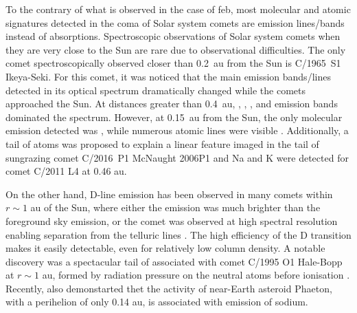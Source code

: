 \documentclass{aa}
\begin{document}
To the contrary of what is observed in the case of \ac{feb}, most molecular and atomic signatures detected in the coma of Solar system comets are emission lines/bands instead of absorptions.
%
Spectroscopic observations of Solar system comets when they are very close to the Sun are rare due to observational difficulties.
%
The only comet spectroscopically observed closer than 0.2~au from the Sun is C/1965~S1 Ikeya-Seki.
%
%
%
For this comet, it was noticed that the main emission bands/lines detected in its optical spectrum dramatically changed while the comets approached the Sun.
%
At distances greater than 0.4~au, , , , and  emission bands dominated the spectrum.
%
However, at 0.15~au from the Sun, the only molecular emission detected was , while numerous atomic lines were visible \citep[, , , , , , , , , ; ][]{Dufay65,Thackeray1966,Preston1967,Slaughter1969}.
%
Additionally, a tail of  atoms was proposed to explain a linear feature imaged in the tail of sungrazing comet C/2016~P1 McNaught 2006P1 \citep{Fulle2007} and Na and K were detected for comet C/2011 L4 \citep{Fulle13} at 0.46 au. 

On the other hand,  D-line emission has been observed in many comets within $r \sim 1$ au of the Sun, where either the emission was much brighter than the foreground sky emission, or the comet was observed at high spectral resolution enabling separation from the telluric lines \citep{Cremonese02,Schmidt16}.
%
The high efficiency of the  D transition makes it easily detectable, even for relatively low column density.
%
A notable discovery was a spectacular tail of  associated with comet C/1995 O1 Hale-Bopp at $r\sim 1$ au, formed by radiation pressure on the neutral atoms before ionisation \citep{Cremonese1997}. 
Recently, \cite{Hui2023} also demonstarted thet the activity of near-Earth asteroid Phaeton, with a perihelion of only 0.14 au, is associated with emission of sodium. 
\end{document}
